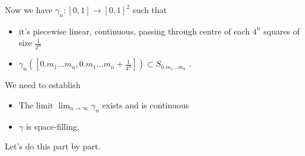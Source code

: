 \documentclass[a4paper]{article}
\theoremstyle{definition}
\begin{document}
Now we have $\gamma_n: [0,1] \rightarrow [0,1]^2$ such that \begin{itemize}
    \item it's piecewise linear, continuous, passing through centre of each $4^n$ squares of size $\frac{1}{2^n}$
    \item $\gamma_n \left(\left[ 0.m_1\ldots m_n, 0.m_1\ldots m_n + \frac{1}{4^n} \right] \right) \subset S_{0.m_1\ldots m_n}$ .
\end{itemize}
We need to establish \begin{itemize}
    \item The limit $\displaystyle \lim_{n\rightarrow \infty} \gamma_n$ exists and is continuous
    \item $\gamma$ is space-filling.
\end{itemize}
Let's do this part by part.
\end{document}
